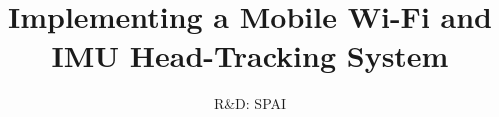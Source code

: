 \documentclass[11pt,a4paper,twocolumn]{report}
\title{Implementing a Mobile Wi-Fi and IMU Head-Tracking System}
\subtitle{R\&D: SPAI}
\begin{document}
	\preface
	
	
	
	
	
	
	
	


	\nocite{*}			%
	
	


%	

	\backcover
\end{document}
